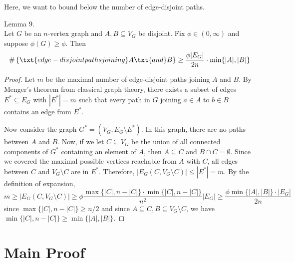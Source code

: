 Here, we want to bound below the number of edge-disjoint paths.

\begin{lem} Lemma $9$. \\
Let $G$ be an $n$-vertex graph and $A, B \subseteq V_G$ be disjoint. Fix $\phi \in (0, \infty)$ and suppose $\phi(G) \geq \phi$.
Then
\[
\#\left\{\txt{edge-disjoint paths joining }A \txt{ and } B\right\} \geq \frac{\phi |E_G|}{2n} \cdot \min\{|A|, |B|\}
\]
\end{lem}
\begin{proof}
Let $m$ be the maximal number of edge-disjoint paths joining $A$ and $B$. 
By Menger's theorem from classical graph theory, there exists a subset of edges $E^* \subseteq E_G$ with $|E^*| = m$ such that every path in $G$ joining $a \in A$ to $b \in B$ contains an edge from $E^*$.

Now consider the graph $G^* = (V_G, E_G \setminus E^*)$. In this graph, there are no paths between $A$ and $B$. Now, if we let $C \subseteq V_G$ be the union of all connected components of $G^*$ containing an element of $A$, then $A \subseteq C$ and $B \cap C = \emptyset$. 
Since we covered the maximal possible vertices reachable from $A$ with $C$, all edges between $C$ and $V_G \setminus C$ are in $E^*$.
Therefore, $|E_G(C, V_G \setminus C)| \leq |E^*| = m$.
By the definition of expansion,
\[
m \geq |E_G(C, V_G\setminus C)| \geq \phi\frac{\max\{|C|, n - |C|\} \cdot \min\{|C|, n - |C|\}}{n^2}|E_G| \geq \frac{\phi \min\{|A|, |B|\}\cdot |E_G|}{2n}
\]
since $\max\{|C|, n - |C|\} \geq n/2$ and since $A \subseteq C, B \subseteq V_G \setminus C$, we have $\min\{|C|, n - |C|\} \geq \min\{|A|, |B|\}$.

\end{proof}


\section{Main Proof}

